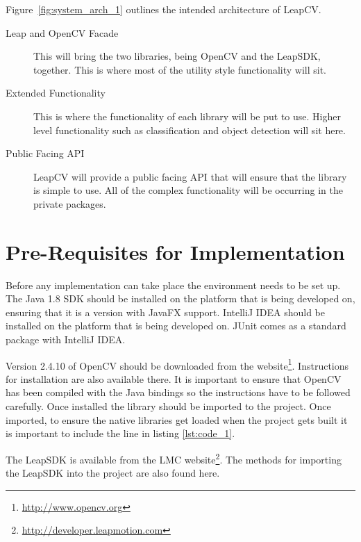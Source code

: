 \documentclass[11pt,oneside]{report}
\begin{document}
			Figure~\ref{fig:system_arch_1} outlines the intended architecture of LeapCV.
			\begin{description}
			\item[Leap and OpenCV Facade] This will bring the two libraries, being OpenCV and the LeapSDK, together.
			This is where most of the utility style functionality will sit.
			\item[Extended Functionality] This is where the functionality of each library will be put to use.
			Higher level functionality such as classification and object detection will sit here.
			\item[Public Facing API] LeapCV will provide a public facing API that will ensure that the library is simple to use.
			All of the complex functionality will be occurring in the private packages.
			\end{description}
			\clearpage
	\section{Pre-Requisites for Implementation}
		Before any implementation can take place the environment needs to be set up.
		The Java 1.8 SDK should be installed on the platform that is being developed on, ensuring that it is a version with JavaFX support.
		IntelliJ IDEA should be installed on the platform that is being developed on.
		JUnit comes as a standard package with IntelliJ IDEA.
		
		Version 2.4.10 of OpenCV should be downloaded from the website\footnote{\url{http://www.opencv.org}}.
		Instructions for installation are also available there.
		It is important to ensure that OpenCV has been compiled with the Java bindings so the instructions have to be followed carefully.
		Once installed the library should be imported to the project. %
		Once imported, to ensure the native libraries get loaded when the project gets built it is important to include the line in listing \ref{lst:code_1}.
		
				
		The LeapSDK is available from the LMC website\footnote{\url{http://developer.leapmotion.com}}.
		The methods for importing the LeapSDK into the project are also found here.
\end{document}
